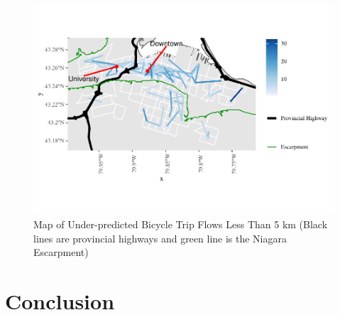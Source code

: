 \documentclass[smallextended]{svjour3}       %
\begin{document}
\begin{figure}
\centering
\includegraphics{BE-correlates-cycling-flows_files/figure-latex/residuals-under-5km-1.pdf}
\caption{\label{fig:residuals-under-5km} Map of Under-predicted Bicycle
Trip Flows Less Than 5 km (Black lines are provincial highways and green
line is the Niagara Escarpment)}
\end{figure}

\hypertarget{sec:conclusion}{%
\section{Conclusion}\label{sec:conclusion}}
\end{document}
